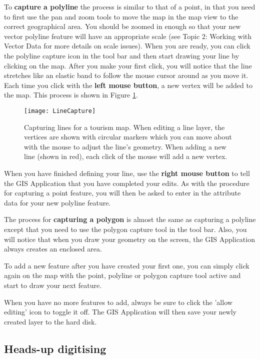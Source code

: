 To \textbf{capture a polyline} the process is similar to that of a point, in that you
need to first use the pan and zoom tools to move the map in the map view to
the correct geographical area. You should be zoomed in enough so that your
new vector polyline feature will have an appropriate scale (see Topic 2:
Working with Vector Data for more details on scale issues). When you are
ready, you can click the polyline capture icon in the tool bar and then start
drawing your line by clicking on the map. After you make your first click,
you will notice that the line stretches like an elastic band to follow the
mouse cursor around as you move it. Each time you click with the \textbf{left
mouse button}, a new vertex will be added to the map. This process is shown in
Figure \ref{fig:linecapture}. 

\begin{figure}[ht]
   \begin{center}
   \caption{Capturing lines for a tourism map. When editing a line layer, the
vertices are shown with circular markers which you can move about with the
mouse to adjust the line's geometry. When adding a new line (shown in red),
each click of the mouse will add a new vertex.}
\label{fig:linecapture}\smallskip
   \texttt{[image: LineCapture]}
\end{center}
\end{figure}

When you have finished defining your line, use the \textbf{right mouse
button} to tell
the GIS Application that you have completed your edits. As with the procedure
for capturing a point feature, you will then be asked to enter in the
attribute data for your new polyline feature.

The process for \textbf{capturing a polygon} is almost the same as capturing a
polyline except that you need to use the polygon capture tool in the tool
bar. Also, you will notice that when you draw your geometry on the screen,
the GIS Application always creates an enclosed area.

To add a new feature after you have created your first one, you can simply
click again on the map with the point, polyline or polygon capture tool
active and start to draw your next feature.

When you have no more features to add, always be sure to click the 'allow
editing' icon to toggle it off. The GIS Application will then save your newly
created layer to the hard disk.

\subsection{Heads-up digitising}

